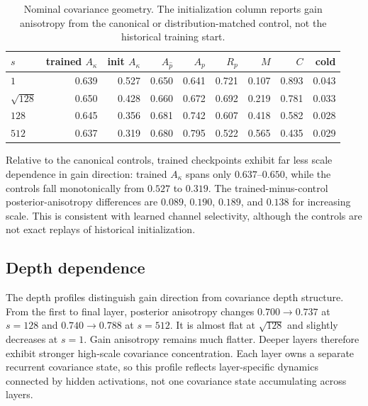 \documentclass[11pt]{article}
\newcommand{\Akap}{A_{\kappa}}
\newcommand{\Apre}{A_{\widehat p}}
\newcommand{\Apost}{A_p}
\newcommand{\Rpost}{R_p}
\newcommand{\Mdom}{M}
\newcommand{\Cret}{C}
\begin{document}
\begin{table}[htbp]
\centering
\caption{Nominal covariance geometry.  The initialization column reports gain anisotropy
from the canonical or distribution-matched control, not the historical training start.}
\label{tab:nominal-geometry}
\small
\begin{tabular}{@{}lrrrrrrrr@{}}
\toprule
$s$ & trained $\Akap$ & init $\Akap$ & $\Apre$ & $\Apost$ & $\Rpost$ & $\Mdom$ & $\Cret$ & cold \\
\midrule
$1$          & 0.639 & 0.527 & 0.650 & 0.641 & 0.721 & 0.107 & 0.893 & 0.043 \\
$\sqrt{128}$ & 0.650 & 0.428 & 0.660 & 0.672 & 0.692 & 0.219 & 0.781 & 0.033 \\
$128$        & 0.645 & 0.356 & 0.681 & 0.742 & 0.607 & 0.418 & 0.582 & 0.028 \\
$512$        & 0.637 & 0.319 & 0.680 & 0.795 & 0.522 & 0.565 & 0.435 & 0.029 \\
\bottomrule
\end{tabular}
\end{table}

Relative to the canonical controls, trained checkpoints exhibit far less scale dependence
in gain direction: trained $\Akap$ spans only $0.637$--$0.650$, while the controls fall
monotonically from $0.527$ to $0.319$.  The trained-minus-control posterior-anisotropy
differences are $0.089$, $0.190$, $0.189$, and $0.138$ for increasing scale.  This is
consistent with learned channel selectivity,
although the controls are not exact replays of historical initialization.

\subsection{Depth dependence}

The depth profiles distinguish gain direction from covariance depth structure.  From the first
to final layer, posterior anisotropy changes $0.700\rightarrow0.737$ at $s=128$ and
$0.740\rightarrow0.788$ at $s=512$.  It is almost flat at $\sqrt{128}$ and slightly decreases
at $s=1$.  Gain anisotropy remains much flatter.  Deeper layers therefore exhibit stronger
high-scale covariance concentration.  Each layer owns a separate recurrent covariance state,
so this profile reflects layer-specific dynamics connected by hidden activations, not one
covariance state accumulating across layers.
\end{document}
